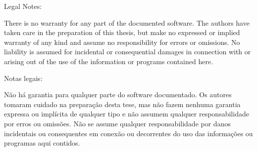 

\ifenglish

Legal Notes:

There is no warranty for any part of the documented software. The authors have taken care in the
preparation of this thesis, but make no expressed or implied warranty of any kind and assume no
responsibility for errors or omissions. No liability is assumed for incidental or consequential
damages in connection with or arising out of the use of the information or programs contained here.

\else

Notas legais:

Não há garantia para qualquer parte do software documentado. Os autores tomaram cuidado na
preparação desta tese, mas não fazem nenhuma garantia expressa ou implícita de qualquer tipo e não
assumem qualquer responsabilidade por erros ou omissões. Não se assume qualquer responsabilidade por
danos incidentais ou consequentes em conexão ou decorrentes do uso das informações ou programas aqui
contidos.

\fi


